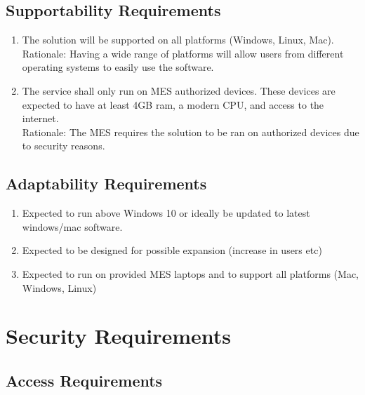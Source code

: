 \documentclass[12pt]{article}
\begin{document}
\subsection{Supportability Requirements}

\begin{enumerate}
  
  \item The solution will be supported on all platforms (Windows, Linux, Mac). \\
  Rationale: Having a wide range of platforms will allow users from different operating systems to easily use the software.
  \item The service shall only run on MES authorized devices. These devices are expected to have at least 4GB ram, a modern CPU, and access to the internet. \\
  Rationale: The MES requires the solution to be ran on authorized devices due to security reasons.
\end{enumerate}
\subsection{Adaptability Requirements}
\begin{enumerate}
  
  \item Expected to run above Windows 10 or ideally be updated to latest windows/mac software. \\
  \item Expected to be designed for possible expansion (increase in users etc) \\
  \item Expected to run on provided MES laptops and to support all platforms (Mac, Windows, Linux)
\end{enumerate}





\section{Security Requirements}
\subsection{Access Requirements}
\end{document}
